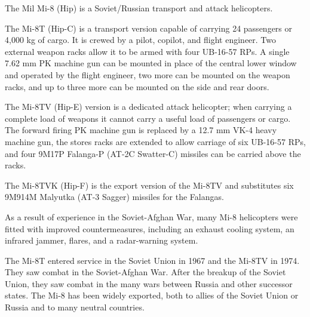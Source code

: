 

The Mil Mi-8 (Hip) is a Soviet/Russian transport and attack helicopters.

The Mi-8T (Hip-C) is a transport version capable of carrying 24 passengers or 4,000 kg of cargo. It is crewed by a pilot, copilot, and flight engineer. Two external weapon racks allow it to be armed with four UB-16-57  RPs. A single 7.62 mm PK machine gun can be mounted in place of the central lower window and operated by the flight engineer, two more can be mounted on the weapon racks, and up to three more can be mounted on the side and rear doors.

The Mi-8TV (Hip-E) version is a dedicated attack helicopter; when carrying a complete load of weapons it cannot carry a useful load of passengers or cargo. The forward firing PK machine gun is replaced by a 12.7 mm VK-4 heavy machine gun, the stores racks are extended to allow carriage of six UB-16-57  RPs, and four 9M17P Falanga-P (AT-2C Swatter-C) missiles can be carried above the racks.

The Mi-8TVK (Hip-F) is the export version of the Mi-8TV and substitutes six 9M914M Malyutka (AT-3 Sagger) missiles for the Falangas.

As a result of experience in the Soviet-Afghan War, many Mi-8 helicopters were fitted with improved countermeasures, including an exhaust cooling system, an infrared jammer, flares, and a radar-warning system.

The Mi-8T entered service in the Soviet Union in 1967 and the Mi-8TV in 1974. They saw combat in the Soviet-Afghan War. After the breakup of the Soviet Union, they saw combat in the many wars between Russia and other successor states. The Mi-8 has been widely exported, both to allies of the Soviet Union or Russia and to many neutral countries.

